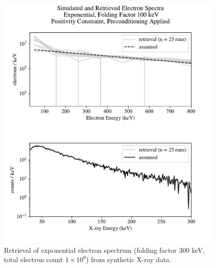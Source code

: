 \begin{figure}[p]
    \centering
    \includegraphics[width=\textwidth]{figures/chapter_4/synthetic_data_examples/exponential_folding_300keV_posonly_preconditioning_1e9_particles}
    \caption{Retrieval of exponential electron spectrum (folding factor 300 keV, total electron count $1\times10^9$) from synthetic X-ray data.}
    \label{why_non_negative_is_good}
\end{figure}



